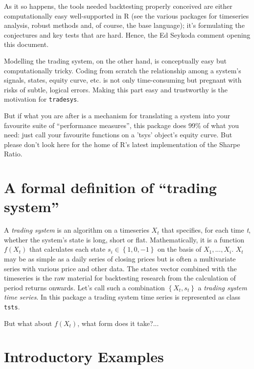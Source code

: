 \documentclass[a4]{article}
\newcommand{\code}[1]{\texttt{#1}}
\begin{document}
As it so happens, the tools needed backtesting properly conceived are
either computationally easy well-supported in R (see the various
packages for timeseries analysis, robust methods and, of course, the
base language); it's formulating the conjectures and key tests that
are hard. Hence, the Ed Seykoda comment opening this document.

Modelling the trading system, on the other hand, is conceptually easy
but computationally tricky. Coding from scratch the relationship
among a system's signals, states, equity curve, etc. is not only
time-consuming but pregnant with risks of subtle, logical
errors. Making this part easy and trustworthy is the motivation for
\code{tradesys}. 

But if what you are after is a mechanism for translating a system into
your favourite suite of ``performance measures'', this package does
99\% of what you need: just call your favourite functions on a 'tsys'
object's equity curve. But please don't look here for the home of R's
latest implementation of the Sharpe Ratio.

\section{A formal definition of ``trading system''}
A \emph{trading system} is an algorithm on a timeseries $X_{t}$ that
specifies, for each time \emph{t}, whether the system's state is long,
short or flat. Mathematically, it is a function $f(X_{t})$ that
calculates each state $s_{i} \in \left\{1,0,-1\right\}$ on the basis
of $X_{1}, ..., X_{i}$. $X_{t}$ may be as simple as a daily series of
closing prices but is often a multivariate series with various price
and other data. The states vector combined with the timeseries is the
raw material for backtesting research from the calculation of period
returns onwards. Let's call such a combination $\left\{X_{t},
s_{t}\right\}$ a \emph{trading system time series}. In this package a
trading system time series is represented as class \code{tsts}.

But what about $f(X_{t})$, what form does it take?...

\section{Introductory Examples}
\end{document}
